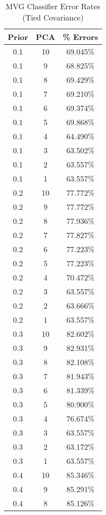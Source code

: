 \begin{center}
\begin{longtable}{|c|c|c|}
\caption{MVG Classifier Error Rates (Tied Covariance)}\label{tab:mvg_tiedacctable}\\
\hline
Prior & PCA & \% Errors \\
\hline
0.1 & 10 & 69.045\% \\
\hline
0.1 & 9 & 68.825\% \\
\hline
0.1 & 8 & 69.429\% \\
\hline
0.1 & 7 & 69.210\% \\
\hline
0.1 & 6 & 69.374\% \\
\hline
0.1 & 5 & 69.868\% \\
\hline
0.1 & 4 & 64.490\% \\
\hline
0.1 & 3 & 63.502\% \\
\hline
0.1 & 2 & 63.557\% \\
\hline
0.1 & 1 & 63.557\% \\
\hline
\hline
0.2 & 10 & 77.772\% \\
\hline
0.2 & 9 & 77.772\% \\
\hline
0.2 & 8 & 77.936\% \\
\hline
0.2 & 7 & 77.827\% \\
\hline
0.2 & 6 & 77.223\% \\
\hline
0.2 & 5 & 77.223\% \\
\hline
0.2 & 4 & 70.472\% \\
\hline
0.2 & 3 & 63.557\% \\
\hline
0.2 & 2 & 63.666\% \\
\hline
0.2 & 1 & 63.557\% \\
\hline
\hline
0.3 & 10 & 82.602\% \\
\hline
0.3 & 9 & 82.931\% \\
\hline
0.3 & 8 & 82.108\% \\
\hline
0.3 & 7 & 81.943\% \\
\hline
0.3 & 6 & 81.339\% \\
\hline
0.3 & 5 & 80.900\% \\
\hline
0.3 & 4 & 76.674\% \\
\hline
0.3 & 3 & 63.557\% \\
\hline
0.3 & 2 & 63.172\% \\
\hline
0.3 & 1 & 63.557\% \\
\hline
\hline
0.4 & 10 & 85.346\% \\
\hline
0.4 & 9 & 85.291\% \\
\hline
0.4 & 8 & 85.126\% \\

\end{longtable}
\end{center}
